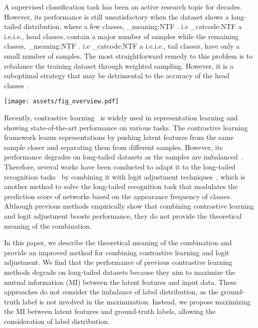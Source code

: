 \documentclass{article}
\makeatletter
\theoremstyle{plain}
\theoremstyle{definition}
\theoremstyle{remark}
\newcommand\latinabbrev[1]{
  \peek_meaning:NTF . {#1\@}{ \peek_catcode:NTF a {#1.\@ }{#1.\@}}}
\def\ie{\latinabbrev{i.e}}
\makeatother
\begin{document}
A supervised classification task has been an active research topic for decades. However, its performance is still unsatisfactory when the dataset shows a long-tailed distribution, where a few classes, \ie, head classes, contain a major number of samples while the remaining classes, \ie, tail classes, have only a small number of samples. The most straightforward remedy to this problem is to rebalance the training dataset through weighted sampling. However, it is a suboptimal strategy that may be detrimental to the accuracy of the head classes~\cite{wang2017learning}.

\begin{figure*}[t]
    \centering
    \texttt{[image: assets/fig\_overview.pdf]}
    \caption{We address the long-tailed recognition by maximizing the mutual information of latent features, , and ground-truth labels, . We solve the maximization problem by dividing it into two terms: an unnormalized likelihood term, , and a logit-adjustment term to compensate for label frequency, .  is a value that depends on the frequency of the label, and  is estimated using a neural network. The proposed loss is achieved by estimating  with Gaussian kernels using latent features of other samples.}
    \label{fig:overview}
\end{figure*}

Recently, contrastive learning~\cite{oord2018representation,chen2020simple,khosla2020supervised} is widely used in representation learning and showing state-of-the-art performance on various tasks. The contrastive learning framework learns representations by pushing latent features from the same sample closer and separating them from different samples. However, its performance degrades on long-tailed datasets as the samples are imbalanced~\cite{cui2021parametric}. Therefore, several works have been conducted to adapt it to the long-tailed recognition tasks~\cite{cui2021parametric,zhu2022balanced} by combining it with logit adjustment techniques~\cite{ren2020balanced,menon2021long}, which is another method to solve the long-tailed recognition task that modulates the prediction score of networks based on the appearance frequency of classes. Although previous methods empirically show that combining contrastive learning and logit adjustment boosts performance, they do not provide the theoretical meaning of the combination.

In this paper, we describe the theoretical meaning of the combination and provide an improved method for combining contrastive learning and logit adjustment. We find that the performance of previous contrastive learning methods degrade on long-tailed datasets because they aim to maximize the mutual information (MI) between the latent features and input data. These approaches do not consider the imbalance of label distribution, as the ground-truth label is not involved in the maximization. Instead, we propose maximizing the MI between latent features and ground-truth labels, allowing the consideration of label distribution.
\end{document}
